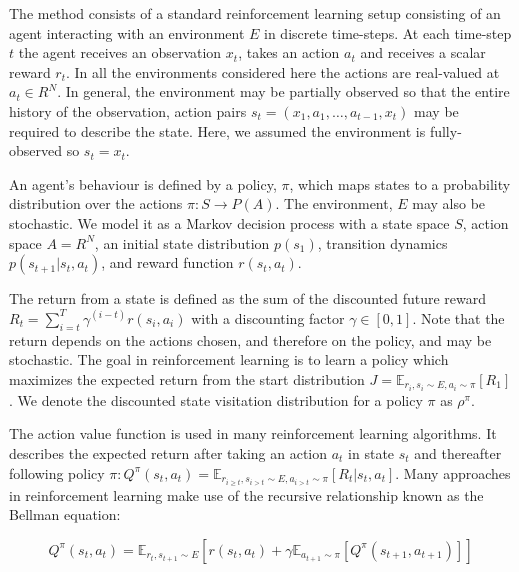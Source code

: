 
The method consists of a standard reinforcement learning setup consisting of an
agent interacting with an environment \(E\) in discrete time-steps. At each
time-step \(t\) the agent receives an observation \(x_t\), takes an action
\(a_t\) and receives a scalar reward \(r_t\). In all the environments
considered here the actions are real-valued at \(a_t \in R^N\). In general, the
environment may be partially observed so that the entire history of the
observation, action pairs \(s_t = \left(x_1, a_1,\dotsc, a_{t-1}, x_t\right)\)
may be required to describe the state. Here, we assumed the environment is
fully-observed so \(s_t = x_t\).

An agent's behaviour is defined by a policy, \(\pi\), which maps states to a
probability distribution over the actions \(\pi : S \rightarrow P(A)\). The
environment, \(E\) may also be stochastic. We model it as a Markov decision
process with a state space \(S\), action space \(A = R^N\), an initial state
distribution \(p\left(s_1\right)\), transition dynamics \(p\left(s_{t+1} | s_t,
a_t\right)\), and reward function \(r\left(s_t, a_t\right)\).

The return from a state is defined as the sum of the discounted future reward
\(R_t = \sum_{i=t}^{T} \gamma^{\left(i - t\right)}r\left(s_i, a_i\right)\) with
a discounting factor \(\gamma \in {[0, 1]}\). Note that the return depends on
the actions chosen, and therefore on the policy, and may be stochastic. The
goal in reinforcement learning is to learn a policy which maximizes the
expected return from the start distribution \(J = \mathbb{E}_{r_i, s_i \sim E,
a_i \sim \pi}\left[R_1\right]\). We denote the discounted state visitation
distribution for a policy \(\pi\) as \(\rho^\pi\).

The action value function is used in many reinforcement learning algorithms. It
describes the expected return after taking an action \(a_t\) in state \(s_t\)
and thereafter following policy \(\pi : Q^\pi\left(s_t, a_t\right) =
\mathbb{E}_{r_{i \geq t}, s_{i > t} \sim E, a_{i > t} \sim \pi} \left[R_t |
s_t, a_t\right]\). Many approaches in reinforcement learning make use of the
recursive relationship known as the Bellman equation:

\begin{equation}
    Q^\pi\left(s_t, a_t\right) = \mathbb{E}_{r_t, s_{t + 1} \sim E}
    \left[r\left(s_t, a_t\right) + \gamma\mathbb{E}_{a_{t + 1} \sim \pi}
    \left[Q^\pi\left(s_{t + 1}, a_{t + 1}\right)\right]\right]
\end{equation}

